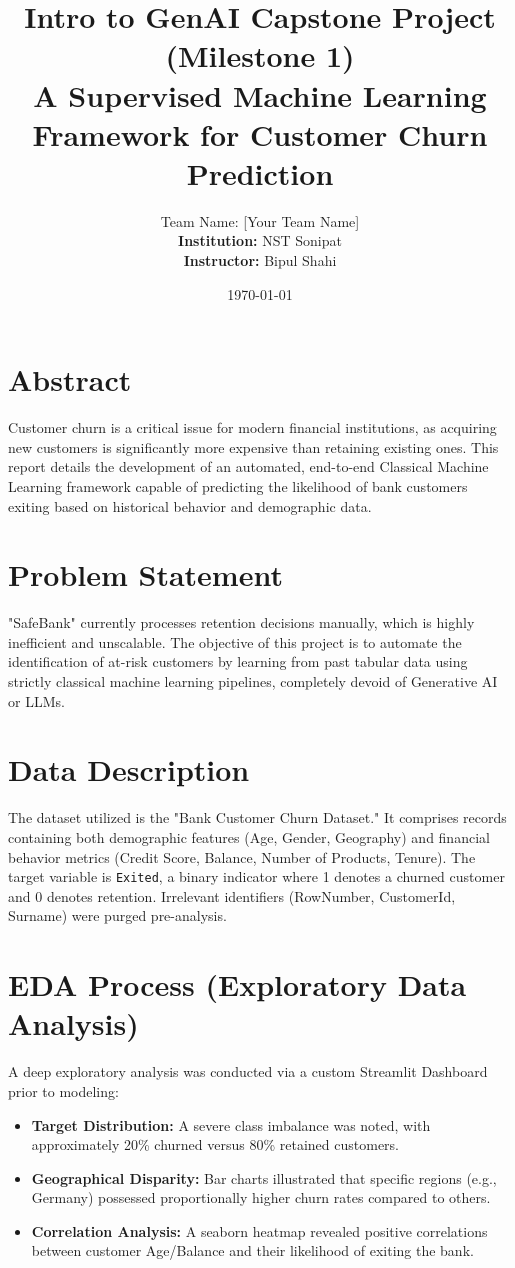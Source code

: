 \documentclass[a4paper,12pt]{article}
\title{\textbf{Intro to GenAI Capstone Project (Milestone 1) \\ A Supervised Machine Learning Framework for Customer Churn Prediction}}
\author{Team Name: [Your Team Name] \\ \textbf{Institution:} NST Sonipat \\ \textbf{Instructor:} Bipul Shahi}
\date{\today}
\begin{document}
\maketitle

\section*{Abstract}
Customer churn is a critical issue for modern financial institutions, as acquiring new customers is significantly more expensive than retaining existing ones. This report details the development of an automated, end-to-end Classical Machine Learning framework capable of predicting the likelihood of bank customers exiting based on historical behavior and demographic data. 

\section{Problem Statement}
"SafeBank" currently processes retention decisions manually, which is highly inefficient and unscalable. The objective of this project is to automate the identification of at-risk customers by learning from past tabular data using strictly classical machine learning pipelines, completely devoid of Generative AI or LLMs.

\section{Data Description}
The dataset utilized is the "Bank Customer Churn Dataset." It comprises records containing both demographic features (Age, Gender, Geography) and financial behavior metrics (Credit Score, Balance, Number of Products, Tenure). The target variable is \texttt{Exited}, a binary indicator where 1 denotes a churned customer and 0 denotes retention. Irrelevant identifiers (RowNumber, CustomerId, Surname) were purged pre-analysis.

\section{EDA Process (Exploratory Data Analysis)}
A deep exploratory analysis was conducted via a custom Streamlit Dashboard prior to modeling:
\begin{itemize}
    \item \textbf{Target Distribution:} A severe class imbalance was noted, with approximately 20\% churned versus 80\% retained customers.
    \item \textbf{Geographical Disparity:} Bar charts illustrated that specific regions (e.g., Germany) possessed proportionally higher churn rates compared to others.
    \item \textbf{Correlation Analysis:} A seaborn heatmap revealed positive correlations between customer Age/Balance and their likelihood of exiting the bank.
\end{itemize}
\end{document}
